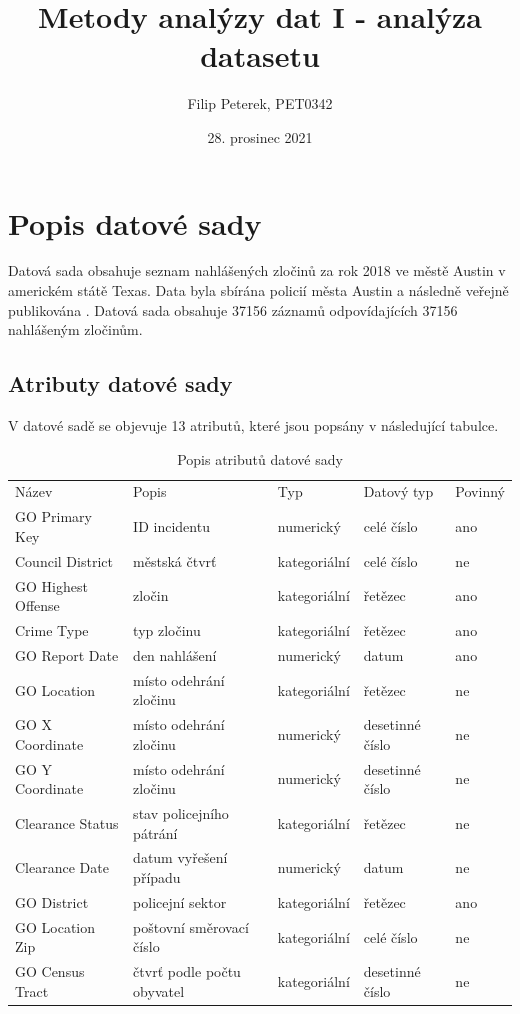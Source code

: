 \documentclass{article}
\title{Metody analýzy dat I - analýza datasetu}
\author{Filip Peterek, PET0342}
\date{28. prosinec 2021}
\begin{document}
\maketitle

\section{Popis datové sady}

Datová sada obsahuje seznam nahlášených zločinů za rok 2018 ve městě Austin
v americkém státě Texas. Data byla sbírána policií města Austin a následně
veřejně publikována \cite{dataset-source}. Datová sada obsahuje 37156 záznamů
odpovídajících 37156 nahlášeným zločinům.

\subsection{Atributy datové sady}

V datové sadě se objevuje 13 atributů, které jsou popsány v následující tabulce.

\begin{table}
  \centering
  \caption{Popis atributů datové sady}
  \begin{tabular}{ |l|l|l|l|l| }
  \hline
    Název & Popis & Typ & Datový typ & Povinný \\
    GO Primary Key & ID incidentu & numerický & celé číslo & ano \\
    Council District & městská čtvrť & kategoriální & celé číslo & ne \\
    GO Highest Offense & zločin & kategoriální & řetězec & ano \\
    Crime Type & typ zločinu & kategoriální & řetězec & ano \\
    GO Report Date & den nahlášení & numerický & datum & ano \\
    GO Location & místo odehrání zločinu & kategoriální & řetězec & ne \\
    GO X Coordinate & místo odehrání zločinu & numerický & desetinné číslo & ne \\
    GO Y Coordinate & místo odehrání zločinu & numerický & desetinné číslo & ne \\
    Clearance Status & stav policejního pátrání & kategoriální & řetězec & ne \\
    Clearance Date & datum vyřešení případu & numerický & datum & ne \\
    GO District & policejní sektor & kategoriální & řetězec & ano \\
    GO Location Zip & poštovní směrovací číslo & kategoriální & celé číslo & ne \\
    GO Census Tract & čtvrť podle počtu obyvatel & kategoriální & desetinné číslo & ne \\
  \hline
  \end{tabular}
\end{table}
\end{document}
